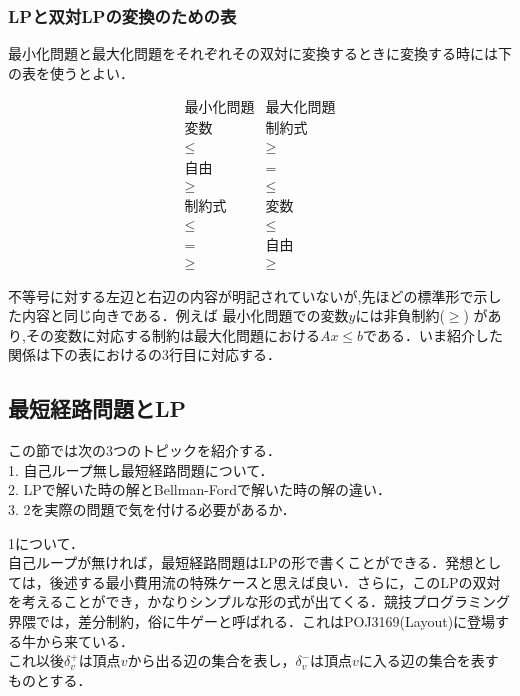 \documentclass[13pt]{jarticle}
\theoremstyle{nonitalic} %
\begin{document}
\subsubsection{LPと双対LPの変換のための表}

最小化問題と最大化問題をそれぞれその双対に変換するときに変換する時には下の表を使うとよい．

\begin{equation*}
\begin{array}{c|c}
  \textrm{最小化問題} &  \textrm{最大化問題} \\ \hline \hline
  \textrm{変数} &  \textrm{制約式} \\ \hline
  \leq & \geq \\
  \textrm{自由} & = \\
  \geq & \leq \\ \hline \hline
  \textrm{制約式} & \textrm{変数} \\ \hline
  \leq & \leq \\
   =   & \textrm{自由} \\
  \geq & \geq
\end{array}
\end{equation*}

不等号に対する左辺と右辺の内容が明記されていないが,先ほどの標準形で示した内容と同じ向きである．例えば 最小化問題での変数$y$には非負制約($ \geq$) があり,その変数に対応する制約は最大化問題における$Ax \leq b$である．いま紹介した関係は下の表におけるの3行目に対応する．

\subsection{最短経路問題とLP}

この節では次の3つのトピックを紹介する． \\
1. 自己ループ無し最短経路問題について． \\
2. LPで解いた時の解とBellman-Fordで解いた時の解の違い．\\
3. 2を実際の問題で気を付ける必要があるか．


1について．\\
自己ループが無ければ，最短経路問題はLPの形で書くことができる．発想としては，後述する最小費用流の特殊ケースと思えば良い．さらに，このLPの双対を考えることができ，かなりシンプルな形の式が出てくる．競技プログラミング界隈では，差分制約，俗に牛ゲーと呼ばれる．これはPOJ3169(Layout)に登場する牛から来ている． \\

これ以後$\delta_{v}^+$は頂点$v$から出る辺の集合を表し，$\delta_{v}^-$は頂点$v$に入る辺の集合を表すものとする．
\end{document}
